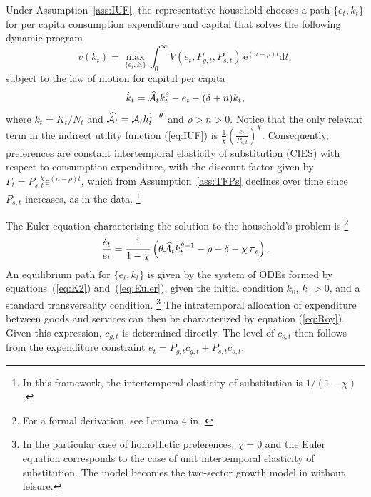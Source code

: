 \documentclass[12pt,a4paper]{article}
\begin{document}
Under Assumption~\ref{ass:IUF}, the representative household chooses a path \( \{e_t, k_t\} \) for per capita consumption expenditure and capital that solves the following dynamic program
\begin{equation}\label{eq:preferences}
v(k_t) = \max_{\{e_t,k_t\}} \int_{0}^{\infty} %
V(e_t, P_{g,t}, P_{s,t}) \, \text{e}^{(n-\rho)t} \text{d} t ,
\end{equation}
subject to the law of motion for capital per capita
\begin{equation}\label{eq:K2}
\dot{k}_t = \widehat{\cal A}_t k_t^\theta - e_t - (\delta + n) k_t,
\end{equation}
where \( k_t = K_t / N_t \) and \( \widehat{\cal A}_t = {\cal A}_t h_t^{1 - \theta} \) and $\rho > n > 0$. 
Notice that the only relevant term in the indirect utility function (\ref{eq:IUF}) is $\frac{1}{\chi} \left( \frac{e_t}{P_{s,t}} \right)^\chi$. 
Consequently, preferences are constant intertemporal elasticity of substitution (CIES) with respect to consumption expenditure, with the discount factor given by \( \Gamma_t = P_{s,t}^{-\chi} \text{e}^{(n - \rho)t} \), which from Assumption~\ref{ass:TFPs} declines over time since \( P_{s,t} \) increases, as in the data.%
\footnote{In this framework, the intertemporal elasticity of substitution is \( 1 / (1 - \chi) \). }


\noindent The Euler equation characterising the solution to the household’s problem is%
\footnote{For a formal derivation, see Lemma 4 in \cite{Boppart_2014}.}
\begin{equation}\label{eq:Euler}
\frac{\dot{e}_t}{e_t} = \frac{1}{1 - \chi} \left( \theta \widehat{\cal A}_t k_t^{\theta - 1} - \rho - \delta - \chi \,
\pi_s
\right).
\end{equation}
An equilibrium path for \( \{e_t, k_t\} \) is given by the system of ODEs formed by equations~(\ref{eq:K2}) and~(\ref{eq:Euler}), given the initial condition \( k_0 \), \( k_0 > 0\), and a standard transversality condition.%
\footnote{In the particular case of homothetic preferences, $\chi =0$ and the Euler equation corresponds to the case of unit intertemporal elasticity of substitution. The model becomes the two-sector growth model in \cite{greenwood1997long} without leisure. }
The intratemporal allocation of expenditure between goods and services can then be characterized by equation (\ref{eq:Roy}).
Given this expression, \( c_{g,t} \) is determined directly. The level of \( c_{s,t} \) then follows from the expenditure constraint \( e_t = P_{g,t} c_{g,t} + P_{s,t} c_{s,t} \).
\end{document}
